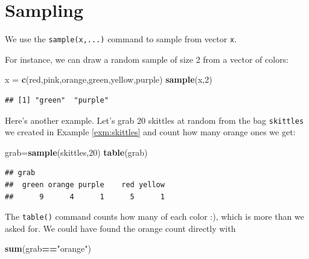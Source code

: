 \documentclass[
]{book}
\newenvironment{Shaded}{\begin{snugshade}}{\end{snugshade}}
\newcommand{\DecValTok}[1]{\textcolor[rgb]{0.00,0.00,0.81}{#1}}
\newcommand{\FunctionTok}[1]{\textcolor[rgb]{0.13,0.29,0.53}{\textbf{#1}}}
\newcommand{\NormalTok}[1]{#1}
\newcommand{\OtherTok}[1]{\textcolor[rgb]{0.56,0.35,0.01}{#1}}
\newcommand{\SpecialCharTok}[1]{\textcolor[rgb]{0.81,0.36,0.00}{\textbf{#1}}}
\newcommand{\StringTok}[1]{\textcolor[rgb]{0.31,0.60,0.02}{#1}}
\theoremstyle{definition}
\theoremstyle{definition}
\theoremstyle{definition}
\theoremstyle{definition}
\theoremstyle{remark}
\begin{document}
\section{Sampling}\label{sampling-in-R-section}

We use the \texttt{sample(x,...)} command to sample from vector \texttt{x}.

For instance, we can draw a random sample of size 2 from a vector of colors:

\begin{Shaded}
\begin{Highlighting}[]
\NormalTok{x }\OtherTok{=} \FunctionTok{c}\NormalTok{(}\StringTok{\textquotesingle{}red\textquotesingle{}}\NormalTok{,}\StringTok{\textquotesingle{}pink\textquotesingle{}}\NormalTok{,}\StringTok{\textquotesingle{}orange\textquotesingle{}}\NormalTok{,}\StringTok{\textquotesingle{}green\textquotesingle{}}\NormalTok{,}\StringTok{\textquotesingle{}yellow\textquotesingle{}}\NormalTok{,}\StringTok{\textquotesingle{}purple\textquotesingle{}}\NormalTok{)}
\FunctionTok{sample}\NormalTok{(x,}\DecValTok{2}\NormalTok{)}
\end{Highlighting}
\end{Shaded}

\begin{verbatim}
## [1] "green"  "purple"
\end{verbatim}

Here's another example. Let's grab 20 skittles at random from the bag \texttt{skittles} we created in Example \ref{exm:skittles} and count how many orange ones we get:

\begin{Shaded}
\begin{Highlighting}[]
\NormalTok{grab}\OtherTok{=}\FunctionTok{sample}\NormalTok{(skittles,}\DecValTok{20}\NormalTok{)}
\FunctionTok{table}\NormalTok{(grab)}
\end{Highlighting}
\end{Shaded}

\begin{verbatim}
## grab
##  green orange purple    red yellow 
##      9      4      1      5      1
\end{verbatim}

The \texttt{table()} command counts how many of each color :), which is more than we asked for. We could have found the orange count directly with

\begin{Shaded}
\begin{Highlighting}[]
\FunctionTok{sum}\NormalTok{(grab}\SpecialCharTok{==}\StringTok{"orange"}\NormalTok{)}
\end{Highlighting}
\end{Shaded}
\end{document}
